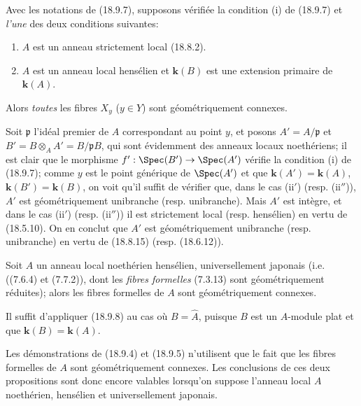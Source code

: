 \begin{corollary}[18.9.8]
\label{IV.18.9.8}
Avec les notations de \textup{(18.9.7)}, supposons vérifiée la condition \textup{(i)} de \textup{(18.9.7)} et \emph{l'une} des deux conditions suivantes:
\begin{enumerate}
  \item[\textup{(ii$'$)}] $A$ est un anneau strictement local \textup{(18.8.2)}.
  \item[\textup{(ii$''$)}] $A$ est un anneau local hensélien et $\boldsymbol{k}(B)$ est une extension primaire de $\boldsymbol{k}(A)$.
\end{enumerate}

Alors \emph{toutes} les fibres $X_y$ \textup{($y\in Y$)} sont géométriquement connexes.
\end{corollary}

Soit $\mathfrak p$ l'idéal premier de $A$ correspondant au point $y$, et posons $A'=A/\mathfrak p$ et $B'=B\otimes_A A'=B/\mathfrak pB$, qui sont évidemment des anneaux locaux noethériens; il est clair que le morphisme $f':\Spec(B')\to\Spec(A')$ vérifie la condition (i) de (18.9.7); comme $y$ est le point générique de $\Spec(A')$ et que $\boldsymbol{k}(A')=\boldsymbol{k}(A)$, $\boldsymbol{k}(B')=\boldsymbol{k}(B)$, on voit qu'il suffit de vérifier que, dans le cas (ii$'$) (resp. (ii$''$)), $A'$ est géométriquement unibranche (resp. unibranche). Mais $A'$ est intègre, et dans le cas (ii$'$) (resp. (ii$''$)) il est strictement local (resp. hensélien) en vertu de (18.5.10). On en conclut que $A'$ est géométriquement unibranche (resp. unibranche) en vertu de (18.8.15) (resp. (18.6.12)).

\begin{corollary}[18.9.9]
\label{IV.18.9.9}
Soit $A$ un anneau local noethérien hensélien, universellement japonais \textup{(i.e. ((7.6.4) et (7.7.2)), dont les \emph{fibres formelles} (7.3.13) sont géométriquement réduites)}; alors les fibres formelles de $A$ sont géométriquement connexes.
\end{corollary}

Il suffit d'appliquer (18.9.8) au cas où $B=\widehat A$, puisque $B$ est un $A$-module plat et que $\boldsymbol{k}(B)=\boldsymbol{k}(A)$.

\begin{remark}[18.9.10]
\label{IV.18.9.10}
Les démonstrations de (18.9.4) et (18.9.5) n'utilisent que le fait que les fibres formelles de $A$ sont géométriquement connexes. Les conclusions
de ces deux propositions sont donc encore valables lorsqu'on suppose l'anneau local $A$ noethérien, hensélien et universellement japonais.
\end{remark}

